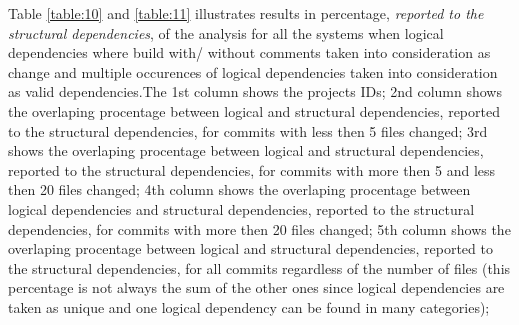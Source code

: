 \newpage

Table \ref{table:10} and \ref{table:11} illustrates results in percentage, \textit{reported to the structural dependencies}, of the analysis for all the systems when logical dependencies where build with/ without comments taken into consideration as change and multiple occurences of logical dependencies taken into consideration as valid dependencies.The 1st column shows the projects IDs; 2nd column shows the overlaping procentage between logical and structural dependencies, reported to the structural dependencies, for commits with less then 5 files changed; 3rd shows the overlaping procentage between logical and structural dependencies, reported to the structural dependencies, for commits with more then 5 and less then 20 files changed; 4th column shows the overlaping procentage between logical dependencies and structural dependencies, reported to the structural dependencies, for commits with more then 20 files changed; 5th column shows the overlaping procentage between logical and structural dependencies, reported to the structural dependencies, for all commits regardless of the number of files (this percentage is not always the sum of the other ones since logical dependencies are taken as unique and one logical dependency can be found in many categories);\\


